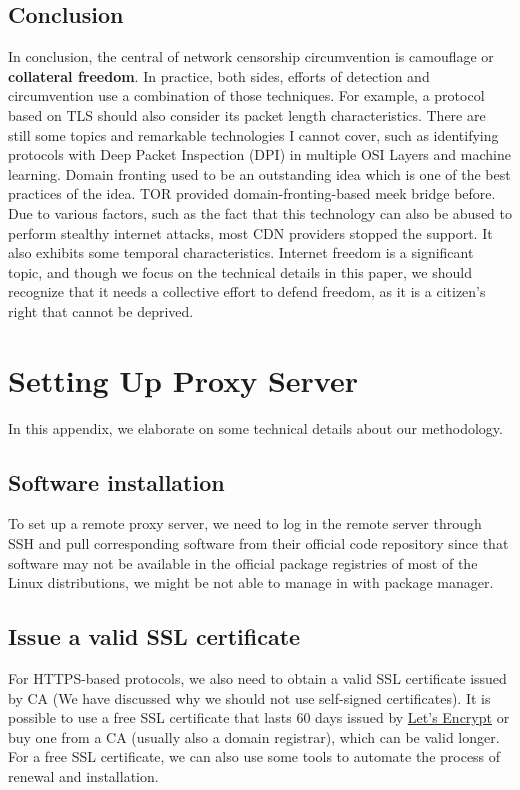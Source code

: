 \documentclass[conference]{IEEEtran}
\begin{document}
\subsection{Conclusion}
In conclusion, the central of network censorship circumvention is camouflage or \textbf{collateral freedom}. In practice, both sides, efforts of detection and circumvention use a combination of those techniques. For example, a protocol based on TLS should also consider its packet length characteristics. There are still some topics and remarkable technologies I cannot cover, such as identifying protocols with Deep Packet Inspection (DPI) in multiple OSI Layers and machine learning. Domain fronting \cite{domainfronting} used to be an outstanding idea which is one of the best practices of the idea. 
TOR provided domain-fronting-based meek bridge \cite{meek} before. Due to various factors, such as the fact that this technology can also be abused to perform stealthy internet attacks, most CDN providers stopped the support. It also exhibits some temporal characteristics. Internet freedom is a significant topic, and though we focus on the technical details in this paper, we should recognize that it needs a collective effort to defend freedom, as it is a citizen's right that cannot be deprived.





\appendix
\section{Setting Up Proxy Server}
In this appendix, we elaborate on some technical details about our methodology.

\subsection{Software installation}
To set up a remote proxy server, we need to log in the remote server through SSH and pull corresponding software from their official code repository since that software may not be available in the official package registries of most of the Linux distributions, we might be not able to manage in with package manager. 

\subsection{Issue a valid SSL certificate}
For HTTPS-based protocols, we also need to obtain a valid SSL certificate issued by CA (We have discussed why we should not use self-signed certificates). It is possible to use a free SSL certificate that lasts 60 days issued by \href{https://letsencrypt.org/}{Let's Encrypt} or buy one from a CA (usually also a domain registrar), which can be valid longer. For a free SSL certificate, we can also use some tools to automate the process of renewal and installation.
\end{document}
